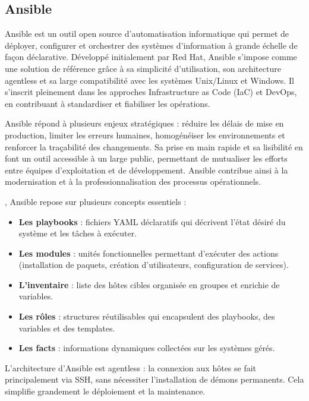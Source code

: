 \subsection{Ansible}

Ansible est un outil open source d’automatisation informatique qui permet de déployer, configurer et orchestrer des systèmes d’information à grande échelle de façon déclarative. Développé initialement par Red Hat, Ansible s’impose comme une solution de référence grâce à sa simplicité d’utilisation, son architecture agentless et sa large compatibilité avec les systèmes Unix/Linux et Windows. Il s’inscrit pleinement dans les approches Infrastructure as Code (IaC) et DevOps, en contribuant à standardiser et fiabiliser les opérations.

 Ansible répond à plusieurs enjeux stratégiques  : réduire les délais de mise en production, limiter les erreurs humaines, homogénéiser les environnements et renforcer la traçabilité des changements. Sa prise en main rapide et sa lisibilité en font un outil accessible à un large public, permettant de mutualiser les efforts entre équipes d’exploitation et de développement. Ansible contribue ainsi à la modernisation et à la professionnalisation des processus opérationnels.

, Ansible repose sur plusieurs concepts essentiels  :
\begin{itemize}
	\item \textbf{Les playbooks}  : fichiers YAML déclaratifs qui décrivent l’état désiré du système et les tâches à exécuter.
	\item \textbf{Les modules}  : unités fonctionnelles permettant d’exécuter des actions (installation de paquets, création d’utilisateurs, configuration de services).
	\item \textbf{L’inventaire}  : liste des hôtes cibles organisée en groupes et enrichie de variables.
	\item \textbf{Les rôles}  : structures réutilisables qui encapsulent des playbooks, des variables et des templates.
	\item \textbf{Les facts}  : informations dynamiques collectées sur les systèmes gérés.
\end{itemize}

L’architecture d’Ansible est agentless  : la connexion aux hôtes se fait principalement via SSH, sans nécessiter l’installation de démons permanents. Cela simplifie grandement le déploiement et la maintenance.

